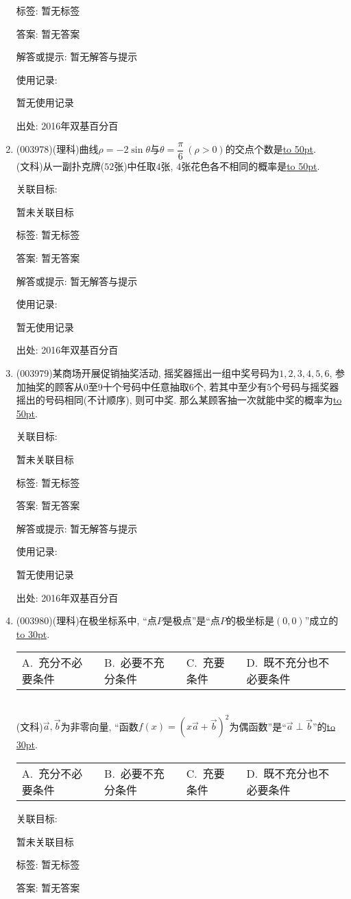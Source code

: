 \documentclass[10pt,a4paper]{article}
\newcommand{\blank}[1]{\underline{\hbox to #1pt{}}}
\newcommand{\fourch}[4]{\par\begin{tabular}{p{.23\textwidth}p{.23\textwidth}p{.23\textwidth}p{.23\textwidth}}
A.~#1 &B.~#2& C.~#3& D.~#4
\end{tabular}}
\begin{document}
\begin{enumerate}[1.]
标签: 暂无标签

答案: 暂无答案

解答或提示: 暂无解答与提示

使用记录:

暂无使用记录


出处: 2016年双基百分百
\item { (003978)}(理科)曲线$\rho=-2\sin\theta$与$\theta=\dfrac{\pi}{6} \ (\rho>0)$的交点个数是\blank{50}.\\
(文科)从一副扑克牌($52$张)中任取$4$张, $4$张花色各不相同的概率是\blank{50}.


关联目标:

暂未关联目标



标签: 暂无标签

答案: 暂无答案

解答或提示: 暂无解答与提示

使用记录:

暂无使用记录


出处: 2016年双基百分百
\item { (003979)}某商场开展促销抽奖活动, 摇奖器摇出一组中奖号码为$1,2,3,4,5,6$, 参加抽奖的顾客从$0$至$9$十个号码中任意抽取$6$个, 若其中至少有$5$个号码与摇奖器摇出的号码相同(不计顺序), 则可中奖. 那么某顾客抽一次就能中奖的概率为\blank{50}.


关联目标:

暂未关联目标



标签: 暂无标签

答案: 暂无答案

解答或提示: 暂无解答与提示

使用记录:

暂无使用记录


出处: 2016年双基百分百
\item { (003980)}(理科)在极坐标系中, ``点$P$是极点''是``点$P$的极坐标是$(0,0)$''成立的\blank{30}.
\fourch{充分不必要条件}{必要不充分条件}{充要条件}{既不充分也不必要条件}\\
(文科)$\overrightarrow a,\overrightarrow b$为非零向量, ``函数$f(x)=(x\overrightarrow a+\overrightarrow b)^2$为偶函数''是``$\overrightarrow a\perp \overrightarrow b$''的\blank{30}.
\fourch{充分不必要条件}{必要不充分条件}{充要条件}{既不充分也不必要条件}


关联目标:

暂未关联目标



标签: 暂无标签

答案: 暂无答案


\end{enumerate}
\end{document}
